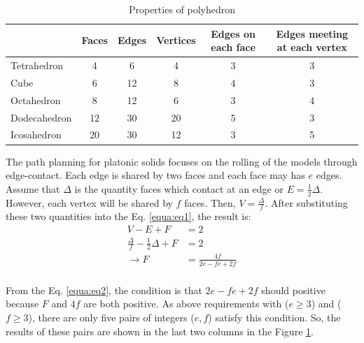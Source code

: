 %
\begin{table}[H]
\centering
\caption{Properties of polyhedron}
\label{tab:tb1}
\begin{tabular}{|l|c|c|c|c|c|}
\hline
             & Faces & Edges & Vertices & Edges on each face & Edges meeting at each vertex \\ \hline
Tetrahedron  & 4     & 6     & 4        & 3                  & 3                            \\ \hline
Cube         & 6     & 12    & 8        & 4                  & 3                            \\ \hline
Octahedron   & 8     & 12    & 6        & 3                  & 4                            \\ \hline
Dodecahedron & 12    & 30    & 20       & 5                  & 3                            \\ \hline
Icosahedron  & 20    & 30    & 12       & 3                  & 5                            \\ \hline
\end{tabular}
\end{table}
%

\noindent The path planning for platonic solids focuses on the rolling of the models through edge-contact. Each edge is shared by two faces and each face may has $e$ edges. Assume that $\Delta $ is the quantity faces which contact at an edge or $E=\frac{1}{2}\Delta $. However, each vertex will be shared by $f$ faces. Then, $V=\frac{\Delta}{f}$. After substituting these two quantities into the Eq. \ref{equa:eq1}, the result is:
%
%
\begin{equation} 
\label{equa:eq2}
\begin{split}
V-E+F &= 2\\
\frac{\Delta}{f} - \frac{1}{2}\Delta + F &= 2\\
\rightarrow F &= \frac{4f}{2e-fe+2f}\\
\end{split}
\end{equation}
%

\noindent From the Eq. \ref{equa:eq2}, the condition is that $2e-fe+2f$ should positive because $F$ and $4f$ are both positive. 
As above requirements with ($e\geq3$) and ($f\geq3$), there are only five pairs of integers ($e,f$) satisfy this condition. 
So, the results of these pairs are shown in the last two columns in the Figure \ref{tab:tb1}.\\

